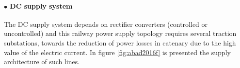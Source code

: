 \paragraph{$\bullet$ DC supply system\\}

The \ac{DC} supply system depends on rectifier converters (controlled or uncontrolled) and this railway power supply topology requires several traction substations, towards the reduction of power losses in catenary due to the high value of the electric current. In figure \ref{fig:abad2016f} is presented the supply architecture of such lines.

